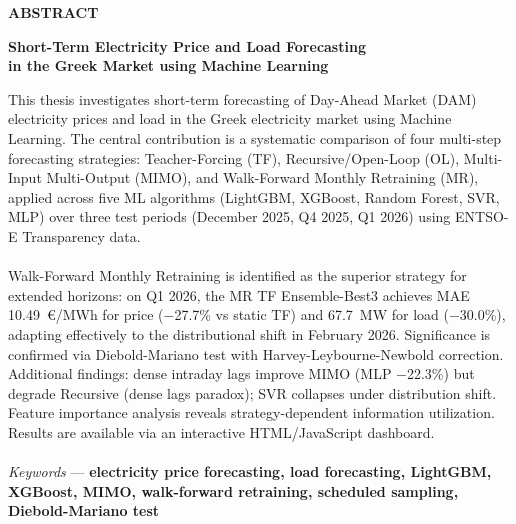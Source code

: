 \begin{center}  \Large{\textbf{ABSTRACT}}  \end{center}
\begin{center}  \Large{\textbf{Short-Term Electricity Price and Load Forecasting\\
in the Greek Market using Machine Learning}}  \end{center}
\vspace{10pt}
\noindent
This thesis investigates short-term forecasting of Day-Ahead Market (DAM) electricity
prices and load in the Greek electricity market using Machine Learning. The central
contribution is a systematic comparison of four multi-step forecasting strategies:
Teacher-Forcing (TF), Recursive/Open-Loop (OL), Multi-Input Multi-Output (MIMO),
and Walk-Forward Monthly Retraining (MR), applied across five ML algorithms
(LightGBM, XGBoost, Random Forest, SVR, MLP) over three test periods (December 2025,
Q4 2025, Q1 2026) using ENTSO-E Transparency data.\\\\
\noindent
Walk-Forward Monthly Retraining is identified as the superior strategy for extended
horizons: on Q1 2026, the MR TF Ensemble-Best3 achieves MAE 10.49~€/MWh for price
(−27.7\% vs static TF) and 67.7~MW for load (−30.0\%), adapting effectively to the
distributional shift in February 2026. Significance is confirmed via Diebold-Mariano
test with Harvey-Leybourne-Newbold correction. Additional findings: dense intraday
lags improve MIMO (MLP −22.3\%) but degrade Recursive (dense lags paradox); SVR
collapses under distribution shift. Feature importance analysis reveals strategy-dependent
information utilization. Results are available via an interactive HTML/JavaScript
dashboard.\\
\vspace{0.3cm}
\\ \textit{Keywords} --- \textbf{electricity price forecasting, load forecasting, LightGBM, XGBoost, MIMO, walk-forward retraining, scheduled sampling, Diebold-Mariano test}